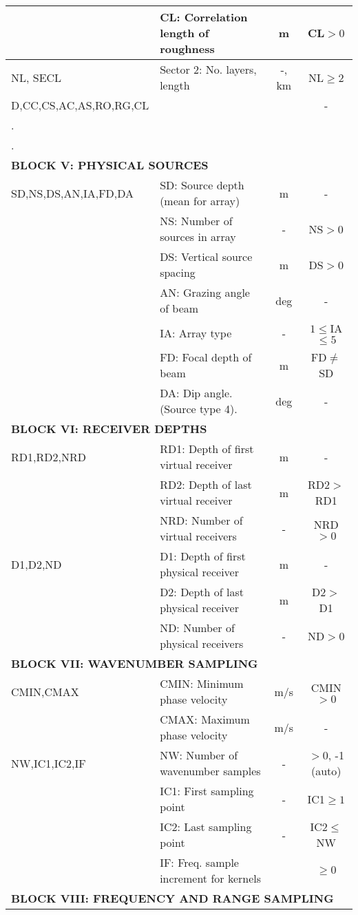 \begin{table}
\begin{center}
\begin{tabular}{|l|l|c|c|}
	& CL: Correlation length of roughness & m & CL$>0$ \\
\hline
NL, SECL	& Sector 2: No. layers, length	& -, km & NL$\geq 2$  \\
D,CC,CS,AC,AS,RO,RG,CL &  &  & - \\
.	& & &  \\
.	& & &  \\
\hline
\multicolumn{4}{|l|}{\bf BLOCK V: PHYSICAL SOURCES} \\
\hline
SD,NS,DS,AN,IA,FD,DA & SD: Source depth (mean for array) & m & - \\
	& NS: Number of sources in array & - &  NS$>0$ \\
	& DS: Vertical source spacing	& m & DS$>0$ \\
	& AN: Grazing angle of beam & deg & - \\
	& IA: Array type & - & $1 \leq $IA$\leq 5$ \\
	& FD: Focal depth of beam & m & FD$\neq$SD \\
        & DA: Dip angle. (Source type 4). & deg & - \\
\hline
\multicolumn{4}{|l|}{\bf BLOCK VI: RECEIVER DEPTHS} \\
\hline
RD1,RD2,NRD & RD1: Depth of first virtual receiver & m & - \\
	& RD2: Depth of last virtual receiver  & m & RD2$>$RD1 \\
	& NRD: Number of virtual receivers & - & NRD$>0$ \\
D1,D2,ND & D1: Depth of first physical receiver & m & - \\
	& D2: Depth of last physical receiver  & m & D2$>$D1 \\
	& ND: Number of physical receivers & - & ND$>0$ \\
\hline
\multicolumn{4}{|l|}{\bf BLOCK VII: WAVENUMBER SAMPLING} \\
\hline
CMIN,CMAX & CMIN: Minimum phase velocity & m/s & CMIN$>0$ \\
	& CMAX: Maximum phase velocity & m/s & - \\
NW,IC1,IC2,IF & NW: Number of wavenumber samples & - & $>0$, -1 (auto) \\
	& IC1: First sampling point & - & IC1$\geq 1$ \\
	& IC2: Last sampling point & - & IC2$\leq$NW \\
        & IF: Freq. sample increment for kernels & & $\geq 0$ \\
\hline
\multicolumn{4}{|l|}{\bf BLOCK VIII: FREQUENCY AND RANGE  SAMPLING} \\

\end{tabular}
\end{center}
\end{table}
